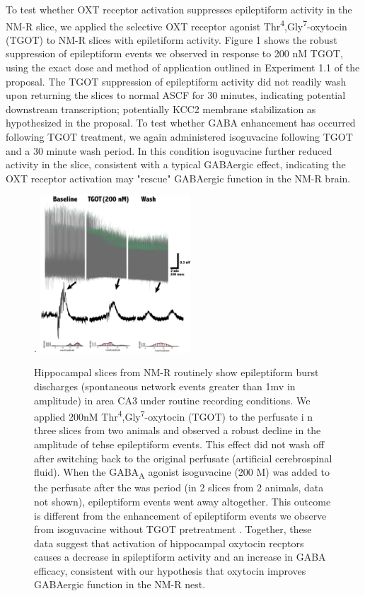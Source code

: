 \documentclass[11pt]{nih}
\begin{document}
\par To test whether OXT receptor activation suppresses epileptiform activity in the NM-R slice, we applied the selective OXT receptor agonist Thr\textsuperscript{4},Gly\textsuperscript{7}-oxytocin (TGOT) to NM-R slices with epiletiform activity.  Figure 1 shows the robust suppression of epileptiform events we observed in response to  200 nM TGOT, using the exact dose and method of application outlined in Experiment 1.1 of the proposal. The TGOT suppression of epileptiform activity did not readily wash upon returning the slices to normal ASCF for 30 minutes, indicating potential downstream transcription; potentially KCC2 membrane stabilization as hypothesized in the proposal. To test whether GABA enhancement has occurred following TGOT treatment, we again administered isoguvacine following TGOT and a 30 minute wash period. In this condition isoguvacine further reduced activity in the slice, consistent with a typical GABAergic effect, indicating the OXT receptor activation may "rescue" GABAergic function in the NM-R brain. 
\begin{figure}.
 \centering
 \includegraphics[width=0.5\textwidth]{TGOT_burst.png}
 \caption{Hippocampal slices from NM-R routinely show epileptiform burst discharges (spontaneous network events greater than 1mv in amplitude) in area CA3 under routine recording conditions. We applied 200nM Thr\textsuperscript{4},Gly\textsuperscript{7}-oxytocin (TGOT) to the perfusate i n three slices from two animals and observed a robust decline in the amplitude of tehse epileptiform events.  This effect did not wash off after switching back to the original perfusate (artificial cerebrospinal fluid). When the GABA\textsubscript {A} agonist isoguvacine (200 \textmu M) was added to the perfusate after the was period (in 2 slices from 2 animals, data not shown), epileptiform events went away altogether. This outcome is different from the enhancement of epileptiform events we observe from isoguvacine without TGOT pretreatment \cite{zions_2020_nest}. Together, these data suggest that activation of hippocampal oxytocin recptors causes a decrease in spileptiform activity and an increase in GABA efficacy, consistent with our hypothesis that oxytocin improves GABAergic function in the NM-R nest.}
\end{figure}
\end{document}
